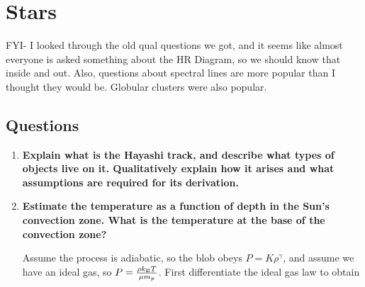 \section{Stars}

FYI- I looked through the old qual questions we got, and it seems like almost everyone is asked 
something about the HR Diagram, so we should know that inside and out.  Also, questions about 
spectral lines are more popular than I thought they would be.  Globular clusters were also popular.

\subsection{Questions}
\begin{enumerate}
\item \textbf{Explain what is the Hayashi track, and describe what types of objects live on it.
      Qualitatively explain how it arises and what assumptions are required for its derivation.}

\item \textbf{Estimate the temperature as a function of depth in the Sun's convection zone. What is the temperature at the base of the convection zone?}

	Assume the process is adiabatic, so the blob obeys $P = K \rho ^\gamma$, and assume we have an ideal gas, so $P = \frac{\rho k_{\rm B} T}{\mu m_p}$. First differentiate the ideal gas law to obtain
	

\end{enumerate}
